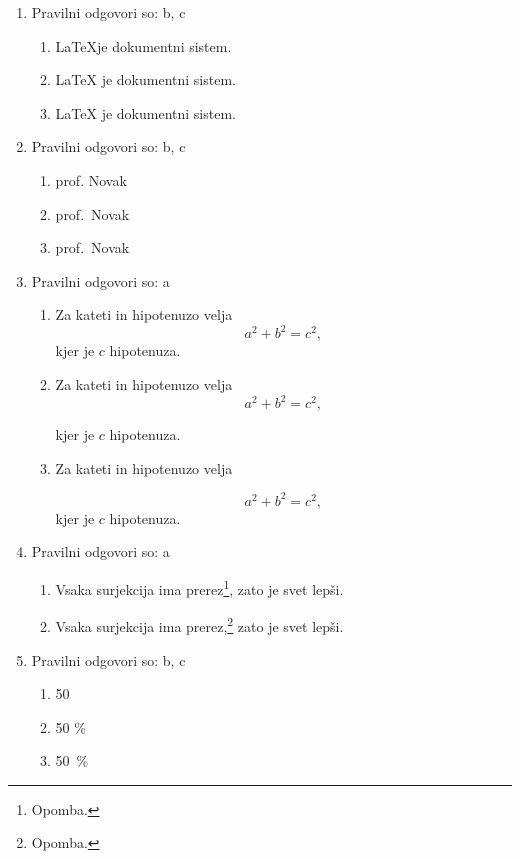 \documentclass[11pt]{article}
\begin{document}
\begin{enumerate}
    \item Pravilni odgovori so: b, c %
    \begin{enumerate}
        \item \LaTeX je dokumentni sistem.
        \item {\LaTeX} je dokumentni sistem.
        \item \LaTeX{} je dokumentni sistem.
    \end{enumerate}

    \item Pravilni odgovori so: b, c %
    \begin{enumerate}
        \item prof. Novak
        \item prof.~Novak
        \item prof.\ Novak
    \end{enumerate}

    \item Pravilni odgovori so: a %
    \begin{enumerate}
        \item
Za kateti in hipotenuzo velja
\[
  a^2 + b^2 = c^2,
\]
kjer je \(c\) hipotenuza.
        \item
Za kateti in hipotenuzo velja
\[
  a^2 + b^2 = c^2,
\]

kjer je \(c\) hipotenuza.
        \item
Za kateti in hipotenuzo velja

\[
  a^2 + b^2 = c^2,
\]
kjer je \(c\) hipotenuza.
    \end{enumerate}

    \item Pravilni odgovori so: a %
    \begin{enumerate}
        \item Vsaka surjekcija ima prerez\footnote{Opomba.}, zato je svet lepši.
        \item Vsaka surjekcija ima prerez,\footnote{Opomba.} zato je svet lepši.
    \end{enumerate}

    \item Pravilni odgovori so: b, c %
    \begin{enumerate}
        \item 50 %
        \item 50 \%
        \item 50~\%
    \end{enumerate}


\end{enumerate}
\end{document}
